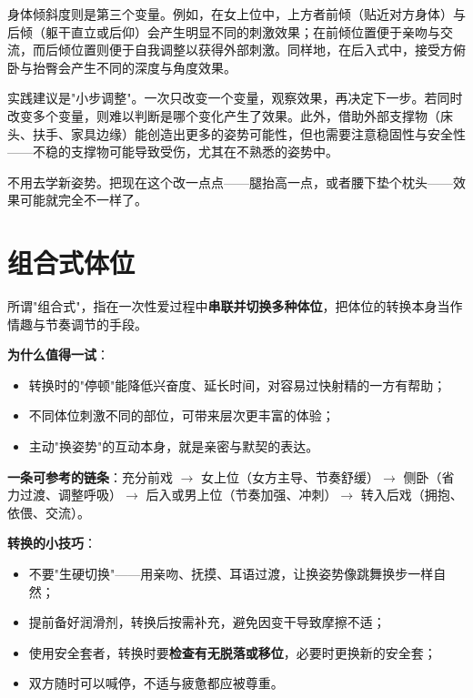 \documentclass[12pt,UTF8]{ctexbook}
\begin{document}
身体倾斜度则是第三个变量。例如，在女上位中，上方者前倾（贴近对方身体）与后倾（躯干直立或后仰）会产生明显不同的刺激效果；在前倾位置便于亲吻与交流，而后倾位置则便于自我调整以获得外部刺激。同样地，在后入式中，接受方俯卧与抬臀会产生不同的深度与角度效果。

实践建议是"小步调整"。一次只改变一个变量，观察效果，再决定下一步。若同时改变多个变量，则难以判断是哪个变化产生了效果。此外，借助外部支撑物（床头、扶手、家具边缘）能创造出更多的姿势可能性，但也需要注意稳固性与安全性——不稳的支撑物可能导致受伤，尤其在不熟悉的姿势中。

\begin{tcolorbox}[colback=pink!5!white,colframe=red!50!black,title=贴心小叮咛]
不用去学新姿势。把现在这个改一点点——腿抬高一点，或者腰下垫个枕头——效果可能就完全不一样了。
\end{tcolorbox}

\section{组合式体位}

所谓"组合式"，指在一次性爱过程中\textbf{串联并切换多种体位}，把体位的转换本身当作情趣与节奏调节的手段。

\noindent\textbf{为什么值得一试}：
\begin{itemize}
	\item 转换时的"停顿"能降低兴奋度、延长时间，对容易过快射精的一方有帮助；
	\item 不同体位刺激不同的部位，可带来层次更丰富的体验；
	\item 主动"换姿势"的互动本身，就是亲密与默契的表达。
\end{itemize}

\noindent\textbf{一条可参考的链条}：充分前戏 $\rightarrow$ 女上位（女方主导、节奏舒缓）$\rightarrow$ 侧卧（省力过渡、调整呼吸）$\rightarrow$ 后入或男上位（节奏加强、冲刺）$\rightarrow$ 转入后戏（拥抱、依偎、交流）。

\noindent\textbf{转换的小技巧}：
\begin{itemize}
	\item 不要"生硬切换"——用亲吻、抚摸、耳语过渡，让换姿势像跳舞换步一样自然；
	\item 提前备好润滑剂，转换后按需补充，避免因变干导致摩擦不适；
	\item 使用安全套者，转换时要\textbf{检查有无脱落或移位}，必要时更换新的安全套；
	\item 双方随时可以喊停，不适与疲惫都应被尊重。
\end{itemize}
\end{document}
